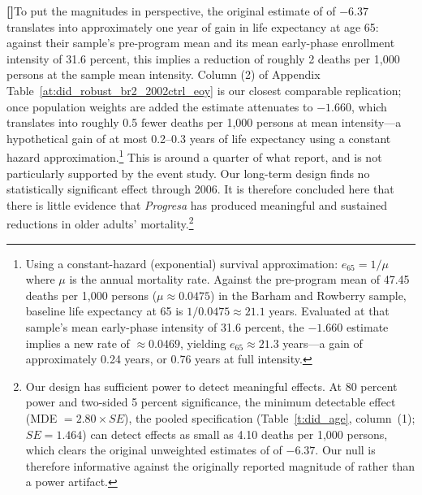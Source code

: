 \documentclass[12pt]{article}
\newcounter{paragraphnum}
\newcommand{\p}{\refstepcounter{paragraphnum}\textbf{[\theparagraphnum]}\enspace}
\begin{document}
\p To put the magnitudes in perspective, the original estimate of \citet{BarhamRowberry2013JDE} of $-6.37$ translates into approximately one year of gain in life expectancy at age 65: against their sample's pre-program mean and its mean early-phase enrollment intensity of 31.6 percent, this implies a reduction of roughly 2 deaths per 1,000 persons at the sample mean intensity. Column (2) of Appendix Table~\ref{at:did_robust_br2_2002ctrl_eoy} is our closest comparable replication; once population weights are added the estimate attenuates to $-1.660$, which translates into roughly 0.5 fewer deaths per 1,000 persons at mean intensity—a hypothetical gain of at most 0.2--0.3 years of life expectancy using a constant hazard approximation.\footnote{Using a constant-hazard (exponential) survival approximation: $e_{65} = 1/\mu$ where $\mu$ is the annual mortality rate. Against the pre-program mean of 47.45 deaths per 1,000 persons ($\mu \approx 0.0475$) in the Barham and Rowberry sample, baseline life expectancy at 65 is $1/0.0475 \approx 21.1$ years. Evaluated at that sample's mean early-phase intensity of 31.6 percent, the $-1.660$ estimate implies a new rate of $\approx 0.0469$, yielding $e_{65} \approx 21.3$ years—a gain of approximately 0.24 years, or 0.76 years at full intensity.} This is around a quarter of what \citet{BarhamRowberry2013JDE} report, and is not particularly supported by the event study. Our long-term design finds no statistically significant effect through 2006. It is therefore concluded here that there is little evidence that \textit{Progresa} has produced meaningful and sustained reductions in older adults' mortality.\footnote{Our design has sufficient power to detect meaningful effects. At 80 percent power and two-sided 5 percent significance, the minimum detectable effect (MDE $=2.80\times SE$), the pooled specification (Table~\ref{t:did_age}, column~(1); $SE=1.464$) can detect effects as small as 4.10 deaths per 1,000 persons, which clears the original unweighted estimates of \cite{BarhamRowberry2013JDE} of $-6.37$. Our null is therefore informative against the originally reported magnitude of \citet{BarhamRowberry2013JDE} rather than a power artifact.} 

\end{document}
